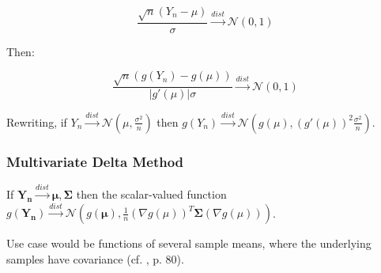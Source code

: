 \begin{equation}
\frac{\sqrt{n}(Y_n - \mu)}{\sigma} \xrightarrow{dist} \mathscr{N}(0,1)
\end{equation}

Then:

\begin{equation}
\frac{\sqrt{n}(g(Y_n)-g(\mu))}{|g'(\mu)|\sigma}\xrightarrow{dist}\mathscr{N}(0,1)
\end{equation}

Rewriting, if $Y_n \xrightarrow{dist}\mathscr{N}(\mu,\frac{\sigma^2}{n})$ then $g(Y_n)\xrightarrow{dist}\mathscr{N}(g(\mu),(g'(\mu))^2\frac{\sigma^2}{n})$.

\subsubsection{Multivariate Delta Method}

If $\mathbf{Y_n} \xrightarrow{dist}\mathscr{\mathbf{\mu},\mathbf{\Sigma}}$ then the scalar-valued function $g(\mathbf{Y_n}) \xrightarrow{dist}\mathscr{N}(g(\mathbf{\mu}),\frac{1}{n} (\nabla g(\mu))^T \mathbf{\Sigma} (\nabla g(\mu)) )$.

Use case would be functions of several sample means, where the underlying samples have covariance (cf. \cite{wasserman2013all}, p. 80).